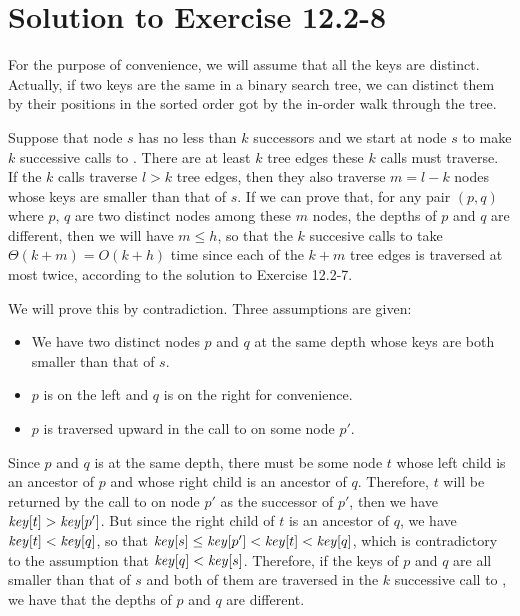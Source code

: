 \documentclass[a4paper, fleqn]{article}
\begin{document}
\section*{Solution to Exercise 12.2-8}

For the purpose of convenience, we will assume that all the keys are
distinct. Actually, if two keys are the same in a binary search tree,
we can distinct them by their positions in the sorted order got by the
in-order walk through the tree.

Suppose that node $s$ has no less than $k$ successors and we start at
node $s$ to make $k$ successive calls to . There
are at least $k$ tree edges these $k$ calls must traverse. If the $k$
calls traverse $l > k$ tree edges, then they also traverse $m = l-k$
nodes whose keys are smaller than that of $s$. If we can prove that,
for any pair $(p,q)$ where $p$, $q$ are two distinct nodes among these
$m$ nodes, the depths of $p$ and $q$ are different, then we will have
$m \leq h$, so that the $k$ succesive calls to 
take $\Theta(k+m) = O(k+h)$ time since each of the $k+m$ tree edges is
traversed at most twice, according to the solution to Exercise 12.2-7.

We will prove this by contradiction. Three assumptions are given:
\begin{itemize}
\item
We have two distinct nodes $p$ and $q$ at the same depth whose keys
are both smaller than that of $s$.

\item
$p$ is on the left and $q$ is on the right for convenience.

\item
$p$ is traversed upward in the call to  on some
node $p'$.
\end{itemize}
Since $p$ and $q$ is at the same depth, there must be some node $t$
whose left child is an ancestor of $p$ and whose right child is an
ancestor of $q$. Therefore, $t$ will be returned by the call to
 on node $p'$ as the successor of $p'$, then we
have $\id{key}[t] > \id{key}[p']$. But since the right child of $t$ is
an ancestor of $q$, we have $\id{key}[t] < \id{key}[q]$, so that
$\id{key}[s] \leq \id{key}[p'] < \id{key}[t] < \id{key}[q]$, which is
contradictory to the assumption that $\id{key}[q] <
\id{key}[s]$. Therefore, if the keys of $p$ and $q$ are all smaller
than that of $s$ and both of them are traversed in the $k$ successive
call to , we have that the depths of $p$ and $q$
are different.
\end{document}
